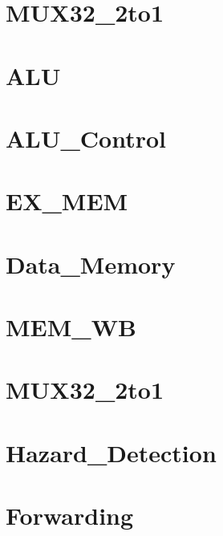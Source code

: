 \section{MUX32_2to1}



\section{ALU}



\section{ALU_Control}



\section{EX_MEM}



\section{Data_Memory}



\section{MEM_WB}



\section{MUX32_2to1}



\section{Hazard_Detection}



\section{Forwarding}


